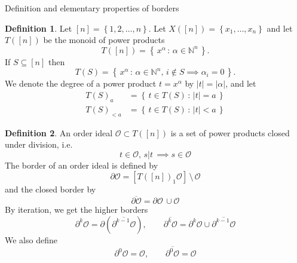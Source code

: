 \documentclass[reqno,a4paper,10pt]{amsart}
\theoremstyle{definition}
\newtheorem{definition}{Definition}
\theoremstyle{remark}
\theoremstyle{plain}
\newcommand{\set}[1]{\left\{{#1}\right\}}
\newcommand\setsuchas[2]{\left\{\,{#1}\,:\,{#2}\,\right\}}
\newcommand{\tdeg}[1]{\lvert #1 \rvert}
\newcommand{\Nat}{{\mathbb{N}}}
\newcommand{\divides}[2]{{#1} \lvert {#2}}
\begin{document}
\begin{section}{Definition and elementary properties of borders}
  \begin{definition}
    Let \([n]=\set{1,2,\dots,n}\).
    Let \(X([n])=\set{x_1,\dots,x_n}\) and let \(T([n])\) be the
    monoid of power products 
    \[T([n]) = \setsuchas{x^\alpha}{\alpha \in   \Nat^n}.\] If 
    \(S \subseteq [n]\) then 
    \[T(S) =
    \setsuchas{x^\alpha}{\alpha \in \Nat^n, \, i \not \in S \implies
      \alpha_i=0}.\] 
    We denote the degree of a power product \(t=x^\alpha\) by
    \(\tdeg{t} = \tdeg{\alpha}\), and let
    \begin{displaymath}
      \begin{split}
        T(S)_a &= \setsuchas{t \in T(S)}{\tdeg{t}=a} \\
        T(S)_{< a} &= \setsuchas{t \in T(S)}{\tdeg{t} < a} 
    \end{split}
    \end{displaymath}
  \end{definition}
  
  \begin{definition}
    An order ideal \(\mathcal{O} \subset T([n])\) is a set
    of power products closed under division, i.e.
    \begin{displaymath}
      t \in \mathcal{O}, \, \divides{s}{t} \, \implies s \in \mathcal{O}
    \end{displaymath}
    The border of an order ideal is defined by
    \begin{displaymath}
      \partial \mathcal{O} = \left[ T([n])_1 \mathcal{O}\right] \,
      \setminus \, \mathcal{O}
    \end{displaymath}
    and the closed border by
    \begin{displaymath}
      \overline{\partial \mathcal{O}} = \partial \mathcal{O} \, \cup
      \mathcal{O} 
    \end{displaymath}
    By iteration, we get the higher borders
    \begin{displaymath}
      \partial^{k} \mathcal{O} = \partial \left(
        \overline{\partial^{k-1} \mathcal{O}} \right), \qquad
       \overline{\partial^{k} \mathcal{O}} = \partial^{k} \mathcal{O}
       \cup \overline{\partial^{k-1} \mathcal{O}}
    \end{displaymath}
    We also define
    \begin{displaymath}
      \partial^{0} \mathcal{O} = \mathcal{O}, \qquad
      \overline{\partial^{0} \mathcal{O}} = \mathcal{O}
    \end{displaymath}
  \end{definition}


\end{section}
\end{document}
